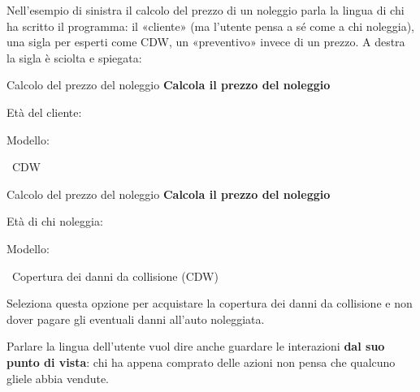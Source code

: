 Nell'esempio di sinistra il calcolo del prezzo di un noleggio parla la lingua di chi ha scritto il programma: il
«cliente» (ma l'utente pensa a sé come a chi noleggia), una sigla per esperti come CDW, un «preventivo» invece di un
prezzo. A destra la sigla è sciolta e spiegata:

\begin{center}
\begin{minipage}[t]{0.38\linewidth}\centering
  \begin{finestra}{Calcolo del prezzo del noleggio}
    {\small\textbf{Calcola il prezzo del noleggio}}\par\smallskip
    Età del cliente: \par\smallskip
    Modello: \par\smallskip
    \casella\ CDW
  \end{finestra}\par\smallskip\male
\end{minipage}\hspace{0.06\linewidth}%
\begin{minipage}[t]{0.42\linewidth}\centering
  \begin{finestra}{Calcolo del prezzo del noleggio}
    {\small\textbf{Calcola il prezzo del noleggio}}\par\smallskip
    Età di chi noleggia: \par\smallskip
    Modello: \par\smallskip
    \casella\ Copertura dei danni da collisione (CDW)\par
    {\tiny Seleziona questa opzione per acquistare la copertura dei danni da collisione e non dover pagare gli
    eventuali danni all'auto noleggiata.}
  \end{finestra}\par\smallskip\bene
\end{minipage}
\end{center}

Parlare la lingua dell'utente vuol dire anche guardare le interazioni \textbf{dal suo punto di vista}: chi ha appena
comprato delle azioni non pensa che qualcuno gliele abbia vendute.

